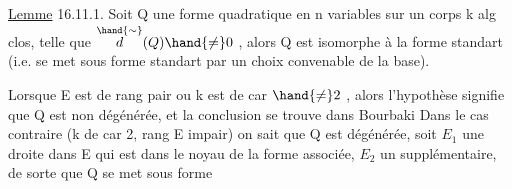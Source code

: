 \uline{Lemme} 16.11.1.  Soit Q une forme quadratique en n variables sur un corps k
alg clos, telle que $\overset{\hand{\sim}}{d}(Q)\hand{\neq} 0$ , alors Q est isomorphe à la forme standart
(i.e. se met sous forme standart par un choix convenable de la base).

Lorsque E est de rang pair ou k est de car $\hand{\neq} 2$ , alors l'hypothèse
signifie que Q est non dégénérée, et la conclusion se trouve dans Bourbaki
Dans le cas contraire (k de car 2,  rang E impair)  on sait que Q est
dégénérée,  soit $E_1$ une droite dans E qui est dans le noyau de la
forme associée, $E_2$ un supplémentaire, de sorte que Q se met sous forme

